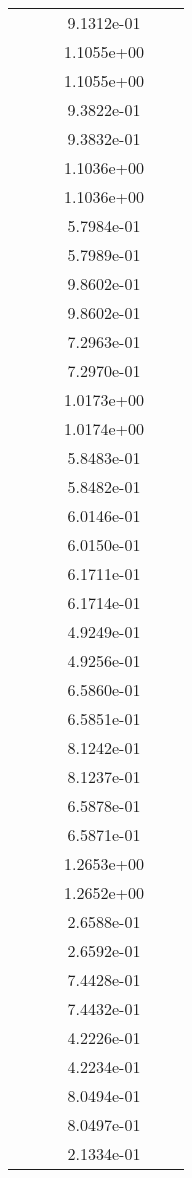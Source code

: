 \begin{xltabular}{\textwidth}{r|rS[table-format=1.3e+2]S[table-format=1.4e+2]S[table-format=1.4e+2]S[table-format=-1.5]}
&  &  & 9.1312e-01 & & \\
&  &  & 1.1055e+00 & & \\
&  &  & 1.1055e+00 & & \\
&  &  & 9.3822e-01 & & \\
&  &  & 9.3832e-01 & & \\
&  &  & 1.1036e+00 & & \\
&  &  & 1.1036e+00 & & \\
&  &  & 5.7984e-01 & & \\
&  &  & 5.7989e-01 & & \\
&  &  & 9.8602e-01 & & \\
&  &  & 9.8602e-01 & & \\
&  &  & 7.2963e-01 & & \\
&  &  & 7.2970e-01 & & \\
&  &  & 1.0173e+00 & & \\
&  &  & 1.0174e+00 & & \\
&  &  & 5.8483e-01 & & \\
&  &  & 5.8482e-01 & & \\
&  &  & 6.0146e-01 & & \\
&  &  & 6.0150e-01 & & \\
&  &  & 6.1711e-01 & & \\
&  &  & 6.1714e-01 & & \\
&  &  & 4.9249e-01 & & \\
&  &  & 4.9256e-01 & & \\
&  &  & 6.5860e-01 & & \\
&  &  & 6.5851e-01 & & \\
&  &  & 8.1242e-01 & & \\
&  &  & 8.1237e-01 & & \\
&  &  & 6.5878e-01 & & \\
&  &  & 6.5871e-01 & & \\
&  &  & 1.2653e+00 & & \\
&  &  & 1.2652e+00 & & \\
&  &  & 2.6588e-01 & & \\
&  &  & 2.6592e-01 & & \\
&  &  & 7.4428e-01 & & \\
&  &  & 7.4432e-01 & & \\
&  &  & 4.2226e-01 & & \\
&  &  & 4.2234e-01 & & \\
&  &  & 8.0494e-01 & & \\
&  &  & 8.0497e-01 & & \\
&  &  & 2.1334e-01 & & \\

\end{xltabular}
